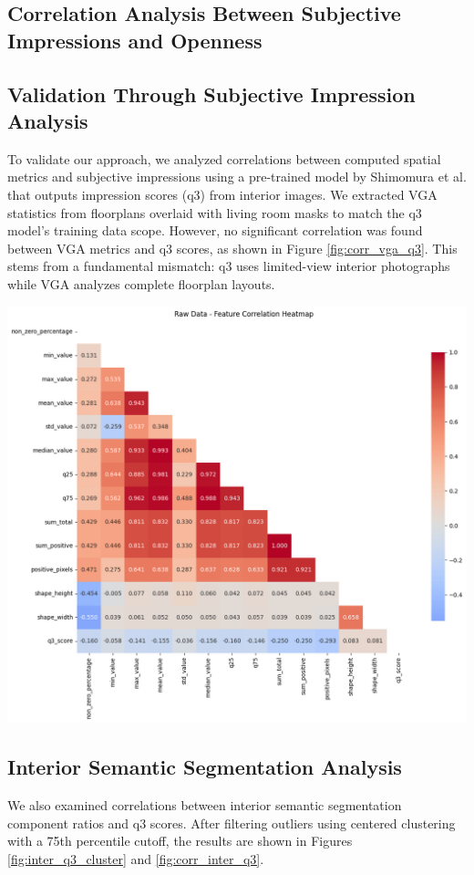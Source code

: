 \documentclass[11pt,a4paper]{article}
\begin{document}
\begin{multicols}{2}
\section{Correlation Analysis Between Subjective Impressions and Openness}

\subsection{Validation Through Subjective Impression Analysis}
To validate our approach, we analyzed correlations between computed spatial metrics and subjective impressions 
using a pre-trained model by Shimomura et al. that outputs impression scores (q3) from interior images.
We extracted VGA statistics from floorplans overlaid with living room masks to match the q3 model's training data scope.
However, no significant correlation was found between VGA metrics and q3 scores, as shown in Figure \ref{fig:corr_vga_q3}.
This stems from a fundamental mismatch: q3 uses limited-view interior photographs while VGA analyzes complete floorplan layouts.

\begin{flushleft}
    \includegraphics[width=0.9\columnwidth]{plots/corr_vga_q3.png}
    \label{fig:corr_vga_q3}
\end{flushleft}

\subsection{Interior Semantic Segmentation Analysis}
We also examined correlations between interior semantic segmentation component ratios and q3 scores. 
After filtering outliers using centered clustering with a 75th percentile cutoff, the results are shown 
in Figures \ref{fig:inter_q3_cluster} and \ref{fig:corr_inter_q3}.


\end{multicols}
\end{document}
